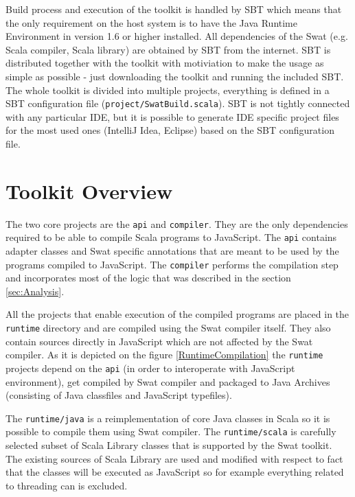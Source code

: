 \documentclass[12pt,a4paper]{report}
\begin{document}
Build process and execution of the toolkit is handled by SBT which means that the only requirement on the host system is to have the Java Runtime Environment in version 1.6 or higher installed. All dependencies of the Swat (e.g. Scala compiler, Scala library) are obtained by SBT from the internet. SBT is distributed together with the toolkit with motiviation to make the usage as simple as possible - just downloading the toolkit and running the included SBT. The whole toolkit is divided into multiple projects, everything is defined in a SBT configuration file (\texttt{project/SwatBuild.scala}). SBT is not tightly connected with any particular IDE, but it is possible to generate IDE specific project files for the most used ones (IntelliJ Idea, Eclipse) based on the SBT configuration file.

\section{Toolkit Overview}

The two core projects are the \texttt{api} and \texttt{compiler}. They are the only dependencies required to be able to compile Scala programs to JavaScript. The \texttt{api} contains adapter classes and Swat specific annotations that are meant to be used by the programs compiled to JavaScript. The \texttt{compiler} performs the compilation step and incorporates most of the logic that was described in the section \ref{sec:Analysis}.

All the projects that enable execution of the compiled programs are placed in the \texttt{runtime} directory and are compiled using the Swat compiler itself. They also contain sources directly in JavaScript which are not affected by the Swat compiler. As it is depicted on the figure \ref{RuntimeCompilation} the \texttt{runtime} projects depend on the \texttt{api} (in order to interoperate with JavaScript environment), get compiled by Swat compiler and packaged to Java Archives (consisting of Java classfiles and JavaScript typefiles).

The \texttt{runtime/java} is a reimplementation of core Java classes in Scala so it is possible to compile them using Swat compiler. The \texttt{runtime/scala} is carefully selected subset of Scala Library classes that is supported by the Swat toolkit. The existing sources of Scala Library are used and modified with respect to fact that the classes will be executed as JavaScript so for example everything related to threading can is excluded.
\end{document}
